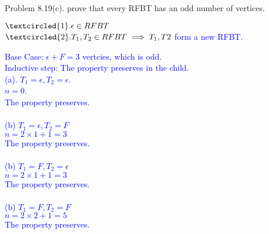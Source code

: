 \documentclass{article}
\begin{document}
\newpage

\begin{addmargin}[2em]{2em}
	Problem 8.19(c). prove that every RFBT has an odd number of vertices.
	
	\noindent
	\textcolor{blue}{
	$\textcircled{1}. \epsilon \in RFBT$\\
	$\textcircled{2}. T_1,T_2 \in RFBT \implies T_1, T2$ form a new RFBT.\\
	}
	
	\noindent
	\textcolor{blue}{
		Base Case: $\epsilon + F = 3 $ vertcies, which is odd.\\
		Inductive step: The property preserves in the child.\\
		(a). $T_1 = \epsilon, T_2 = \epsilon$.\\
		\quad $n = 0$.\\
		The property preserves.\\\\
		(b) $T_1 = \epsilon, T_2 = F$\\
			$n = 2 \times 1 +1 = 3$\\
			The property preserves. \\\\
		(b) $T_1 = F, T_2 = \epsilon$\\
		$n = 2 \times 1 +1 = 3$\\
		The property preserves. \\\\
		(b) $T_1 = F, T_2 = F$\\
		$n = 2 \times 2 +1 = 5$\\
		The property preserves. 
	}
\end{addmargin}


\clearpage
\end{document}

